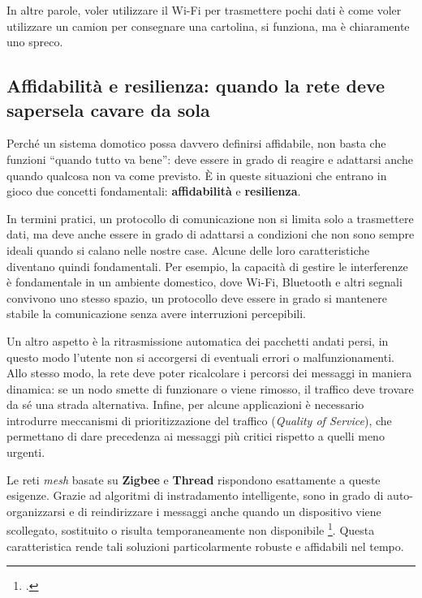 In altre parole, voler utilizzare il Wi-Fi per trasmettere pochi dati è come voler utilizzare un camion per consegnare una cartolina, si funziona, ma è chiaramente uno spreco.

\vspace{0.5cm}

\subsection{Affidabilità e resilienza: quando la rete deve sapersela cavare da sola}

Perché un sistema domotico possa davvero definirsi affidabile, non basta che funzioni “quando tutto va bene”: deve essere in grado di reagire e adattarsi anche quando qualcosa non va come previsto. È in queste situazioni che entrano in gioco due concetti fondamentali: \textbf{affidabilità} e \textbf{resilienza}.

In termini pratici, un protocollo di comunicazione non si limita solo a trasmettere dati, ma deve anche essere in grado di adattarsi a condizioni che non sono sempre ideali quando si calano nelle nostre case. Alcune delle loro caratteristiche diventano quindi fondamentali. Per esempio, la capacità di gestire le interferenze è fondamentale in un ambiente domestico, dove Wi-Fi, Bluetooth e altri segnali convivono uno stesso spazio, un protocollo deve essere in grado si mantenere stabile la comunicazione senza avere interruzioni percepibili.  

Un altro aspetto è la ritrasmissione automatica dei pacchetti andati persi, in questo modo l’utente non si accorgersi di eventuali errori o malfunzionamenti. Allo stesso modo, la rete deve poter ricalcolare i percorsi dei messaggi in maniera dinamica: se un nodo smette di funzionare o viene rimosso, il traffico deve trovare da sé una strada alternativa. Infine, per alcune applicazioni è necessario introdurre meccanismi di prioritizzazione del traffico (\textit{Quality of Service}), che permettano di dare precedenza ai messaggi più critici rispetto a quelli meno urgenti.  

Le reti \textit{mesh} basate su \textbf{Zigbee} e \textbf{Thread} rispondono esattamente a queste esigenze. Grazie ad algoritmi di instradamento intelligente, sono in grado di auto-organizzarsi e di reindirizzare i messaggi anche quando un dispositivo viene scollegato, sostituito o risulta temporaneamente non disponibile \footcite{zigbee-spec,thread-spec}. Questa caratteristica rende tali soluzioni particolarmente robuste e affidabili nel tempo.


